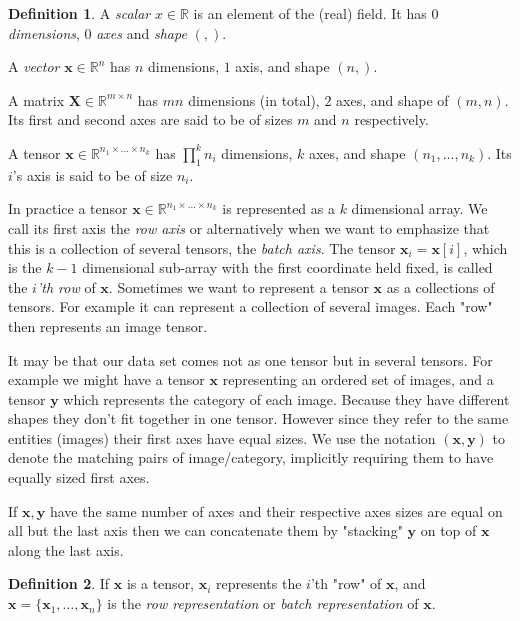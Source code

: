 \documentclass[11pt, a4paper]{report}
\theoremstyle{plain}
\theoremstyle{definition}
\newtheorem{mydef}{Definition}[chapter]
\theoremstyle{remark}
\newcommand{\R}{\mathbb{R}}
\newcommand{\X}{\mathbf{X}}
\newcommand{\x}{\mathbf{x}}
\newcommand{\y}{\mathbf{y}}
\begin{document}
\begin{mydef}
\label{def:tensor}
A \emph{scalar} $x \in \R$ is an element of the (real) field. It has $0$
\emph{dimensions}, $0$ \emph{axes} and \emph{shape} $(,)$.

A \emph{vector} $\x \in \R^n$ has $n$ dimensions, $1$ axis, and shape $(n,)$.

A matrix $\X \in \R^{m \times n}$ has $mn$ dimensions (in total), $2$ axes, and
shape of $(m,n)$. Its first and second axes are said to be of sizes $m$ and $n$
respectively.

A tensor $\x \in \R^{n_1 \times \dots \times n_k}$ has $\prod_1^k n_i$
dimensions, $k$ axes, and shape $(n_1, \dots, n_k)$. Its $i$'s axis is said to
be of size $n_i$.
\end{mydef}

In practice a tensor $\x \in \R^{n_1 \times \dots \times n_k}$ is represented as
a $k$ dimensional array. We call its first axis the \emph{row axis} or
alternatively when we want to emphasize that this is a collection of several
tensors, the \emph{batch axis}. The tensor $\x_i = \x[i]$, which is the $k-1$
dimensional sub-array with the first coordinate held fixed, is called the
\emph{$i$'th row} of $\x$. Sometimes we want to represent a tensor $\x$ as a
collections of tensors. For example it can represent a collection of several
images. Each "row" then represents an image tensor.

It may be that our data set comes not as one tensor but in several tensors. For
example we might have a tensor $\x$ representing an ordered set of images, and a
tensor $\y$ which represents the category of each image. Because they have
different shapes they don't fit together in one tensor. However since they refer
to the same entities (images) their first axes have equal sizes. We use the
notation $(\x, \y)$ to denote the matching pairs of image/category, implicitly
requiring them to have equally sized first axes.

If $\x,\y$ have the same number of axes and their respective axes sizes are
equal on all but the last axis then we can concatenate them by "stacking" $\y$
on top of $\x$ along the last axis.

\begin{mydef}
\label{def:rowrep}
If $\x$ is a tensor, $\x_i$ represents the $i$'th "row" of $\x$,
and $\x = \{\x_1, \dots , \x_n\}$ is the \emph{row representation} or 
\emph{batch
representation} of $\x$.
\end{mydef}
\end{document}
